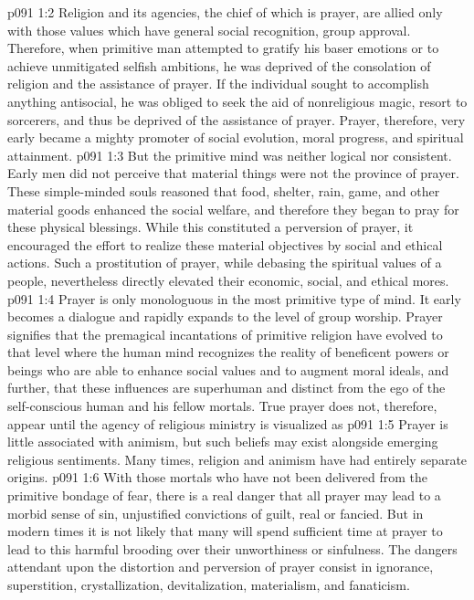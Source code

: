 \vs p091 1:2 \pc Religion and its agencies, the chief of which is prayer, are allied only with those values which have general social recognition, group approval. Therefore, when primitive man attempted to gratify his baser emotions or to achieve unmitigated selfish ambitions, he was deprived of the consolation of religion and the assistance of prayer. If the individual sought to accomplish anything antisocial, he was obliged to seek the aid of nonreligious magic, resort to sorcerers, and thus be deprived of the assistance of prayer. Prayer, therefore, very early became a mighty promoter of social evolution, moral progress, and spiritual attainment.
\vs p091 1:3 But the primitive mind was neither logical nor consistent. Early men did not perceive that material things were not the province of prayer. These simple\hyp{}minded souls reasoned that food, shelter, rain, game, and other material goods enhanced the social welfare, and therefore they began to pray for these physical blessings. While this constituted a perversion of prayer, it encouraged the effort to realize these material objectives by social and ethical actions. Such a prostitution of prayer, while debasing the spiritual values of a people, nevertheless directly elevated their economic, social, and ethical mores.
\vs p091 1:4 Prayer is only monologuous in the most primitive type of mind. It early becomes a dialogue and rapidly expands to the level of group worship. Prayer signifies that the premagical incantations of primitive religion have evolved to that level where the human mind recognizes the reality of beneficent powers or beings who are able to enhance social values and to augment moral ideals, and further, that these influences are superhuman and distinct from the ego of the self\hyp{}conscious human and his fellow mortals. True prayer does not, therefore, appear until the agency of religious ministry is visualized as 
\vs p091 1:5 \pc Prayer is little associated with animism, but such beliefs may exist alongside emerging religious sentiments. Many times, religion and animism have had entirely separate origins.
\vs p091 1:6 \pc With those mortals who have not been delivered from the primitive bondage of fear, there is a real danger that all prayer may lead to a morbid sense of sin, unjustified convictions of guilt, real or fancied. But in modern times it is not likely that many will spend sufficient time at prayer to lead to this harmful brooding over their unworthiness or sinfulness. The dangers attendant upon the distortion and perversion of prayer consist in ignorance, superstition, crystallization, devitalization, materialism, and fanaticism.
